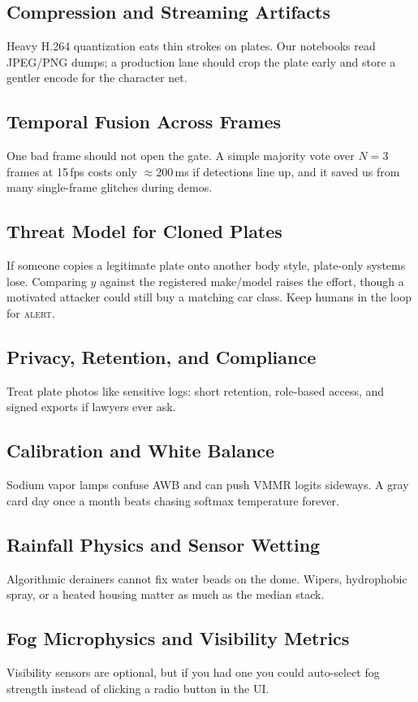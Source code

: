\documentclass[10pt, conference]{IEEEtran}
\begin{document}
\subsection{Compression and Streaming Artifacts}
Heavy H.264 quantization eats thin strokes on plates. Our notebooks read JPEG/PNG dumps; a production lane should crop the plate early and store a gentler encode for the character net.

\subsection{Temporal Fusion Across Frames}
One bad frame should not open the gate. A simple majority vote over $N{=}3$ frames at 15\,fps costs only $\approx$200\,ms if detections line up, and it saved us from many single-frame glitches during demos.

\subsection{Threat Model for Cloned Plates}
If someone copies a legitimate plate onto another body style, plate-only systems lose. Comparing $y$ against the registered make/model raises the effort, though a motivated attacker could still buy a matching car class. Keep humans in the loop for \textsc{alert}.

\subsection{Privacy, Retention, and Compliance}
Treat plate photos like sensitive logs: short retention, role-based access, and signed exports if lawyers ever ask.

\subsection{Calibration and White Balance}
Sodium vapor lamps confuse AWB and can push VMMR logits sideways. A gray card day once a month beats chasing softmax temperature forever.

\subsection{Rainfall Physics and Sensor Wetting}
Algorithmic derainers cannot fix water beads on the dome. Wipers, hydrophobic spray, or a heated housing matter as much as the median stack.

\subsection{Fog Microphysics and Visibility Metrics}
Visibility sensors are optional, but if you had one you could auto-select fog strength instead of clicking a radio button in the UI.
\end{document}
